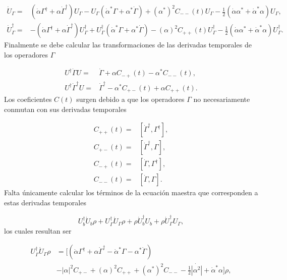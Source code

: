 \documentclass[10pt,a4paper]{report}
\begin{document}
\begin{align}
\dot{U}_\Gamma =&(\dot{\alpha}\Gamma^\dagger +\alpha \dot{\Gamma}^\dagger)U_\Gamma - U_\Gamma(\dot{\alpha}^*\Gamma+\alpha^* \dot{\Gamma}) + (\alpha^*)^2 C_{--}(t)U_\Gamma-\frac{1}{2}(\dot{\alpha} \alpha^*+\dot{\alpha}^* \alpha)U_\Gamma, \\
\dot{U}^\dagger_\Gamma=&-(\dot{\alpha}\Gamma^\dagger +\alpha \dot{\Gamma}^\dagger)U_\Gamma^\dagger + U_\Gamma^\dagger(\dot{\alpha}^*\Gamma+\alpha^* \dot{\Gamma}) - (\alpha)^2 C_{++}(t)U_\Gamma^\dagger-\frac{1}{2}(\dot{\alpha} \alpha^*+\dot{\alpha}^* \alpha)U_\Gamma^\dagger.
\end{align} Finalmente se debe calcular las transformaciones de las derivadas temporales de los operadores $\Gamma$

\begin{align}
U^{\dagger}\dot{\Gamma}U =& \dot{\Gamma} + \alpha C_{-+}(t) -\alpha^* C_{--}(t),\\
U^{\dagger}\dot{\Gamma}^\dagger U =& \dot{\Gamma}^\dagger - \alpha^* C_{+-}(t) +\alpha C_{++}(t). 
\end{align} Los coeficientes $C(t)$ surgen debido a que los operadores $\Gamma$ no necesariamente conmutan con sus derivadas temporales

\begin{align*}
C_{++}(t) =& [\dot{\Gamma}^{\dagger}, \Gamma^{\dagger}],\\
C_{+-}(t) =& [\dot{\Gamma}^{\dagger}, \Gamma],\\
C_{-+}(t) =& [\dot{\Gamma}, \Gamma^{\dagger}],\\
C_{--}(t) =& [\dot{\Gamma}, \Gamma].
\end{align*} Falta únicamente calcular los términos de la ecuación maestra que corresponden a estas derivadas temporales

\begin{equation}
U_b^\dagger \dot{U}_b \rho + U_\Gamma^\dagger \dot{U}_\Gamma \rho + \rho \dot{U}_b^\dagger U_b+ \rho \dot{U}_\Gamma^\dagger U_\Gamma,
\end{equation} los cuales resultan ser

\begin{align}
U_\Gamma^\dagger \dot{U}_\Gamma \rho &= [(\dot{\alpha}\Gamma^\dagger + \alpha \dot{\Gamma}^\dagger - \dot{\alpha}^*\Gamma -\alpha^*\dot{\Gamma} ) \\
 &- |\alpha|^2C_{+-} + (\alpha)^2C_{++} + (\alpha^*)^2 C_{--} - \frac{1}{2}\dot{|\alpha^2|} + \dot{\alpha}^*\alpha]\rho \nonumber,
\end{align}
\end{document}
